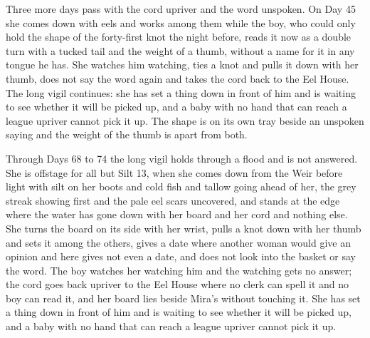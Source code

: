 \documentclass{design/chronicle}
\begin{document}
{Three more days pass with the cord upriver and the word unspoken. On Day 45 she comes down with eels and works among them while the boy, who could only hold the shape of the forty-first knot the night before, reads it now as a double turn with a tucked tail and the weight of a thumb, without a name for it in any tongue he has. She watches him watching, ties a knot and pulls it down with her thumb, does not say the word again and takes the cord back to the Eel House. The long vigil continues: she has set a thing down in front of him and is waiting to see whether it will be picked up, and a baby with no hand that can reach a league upriver cannot pick it up. The shape is on its own tray beside an unspoken saying and the weight of the thumb is apart from both.

Through Days 68 to 74 the long vigil holds through a flood and is not answered. She is offstage for all but Silt 13, when she comes down from the Weir before light with silt on her boots and cold fish and tallow going ahead of her, the grey streak showing first and the pale eel scars uncovered, and stands at the edge where the water has gone down with her board and her cord and nothing else. She turns the board on its side with her wrist, pulls a knot down with her thumb and sets it among the others, gives a date where another woman would give an opinion and here gives not even a date, and does not look into the basket or say the word. The boy watches her watching him and the watching gets no answer; the cord goes back upriver to the Eel House where no clerk can spell it and no boy can read it, and her board lies beside Mira’s without touching it. She has set a thing down in front of him and is waiting to see whether it will be picked up, and a baby with no hand that can reach a league upriver cannot pick it up.

\begin{itemize}[leftmargin=1.4em,itemsep=1pt,topsep=3pt,parsep=0pt]


\end{itemize}}
\end{document}
